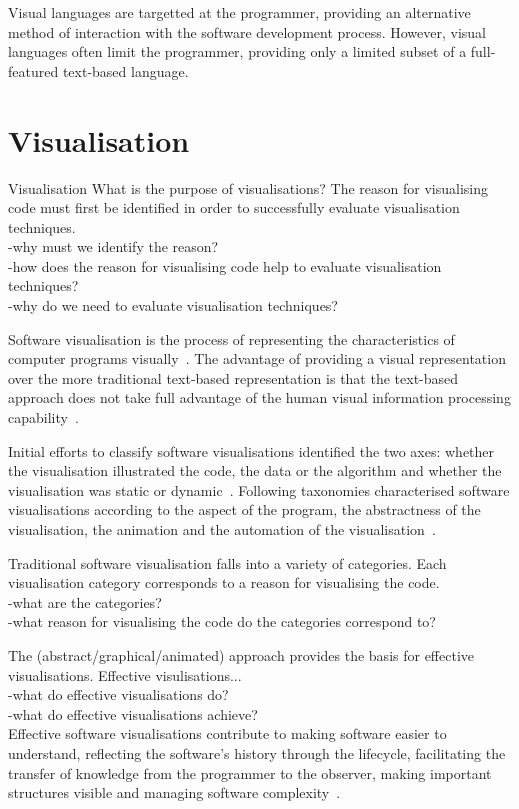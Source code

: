Visual languages are targetted at the programmer, providing an alternative method of interaction with the software development process. However, visual languages often limit the programmer, providing only a limited subset of a full-featured text-based language.

\section{Visualisation}

Visualisation 
What is the purpose of visualisations?
The reason for visualising code must first be identified in order to successfully evaluate visualisation techniques.\\
-why must we identify the reason?\\
-how does the reason for visualising code help to evaluate visualisation techniques?\\
-why do we need to evaluate visualisation techniques?

Software visualisation is the process of representing the characteristics of computer programs visually~\cite{Stasko1992}. The advantage of providing a visual representation over the more traditional text-based representation is that the text-based approach does not take full advantage of the human visual information processing capability~\cite{Myers1989}.

Initial efforts to classify software visualisations identified the two axes: whether the visualisation illustrated the code, the data or the algorithm and whether the visualisation was static or dynamic~\cite{Myers1989}. Following taxonomies characterised software visualisations according to the aspect of the program, the abstractness of the visualisation, the animation and the automation of the visualisation~\cite{Stasko1992}.


Traditional software visualisation falls into a variety of categories. Each visualisation category corresponds to a reason for visualising the code.\\
-what are the categories?\\
-what reason for visualising the code do the categories correspond to?

The (abstract/graphical/animated) approach provides the basis for effective visualisations. Effective visulisations...\\
-what do effective visualisations do?\\
-what do effective visualisations achieve?\\
Effective software visualisations contribute to making software easier to understand, reflecting the software's history through the lifecycle, facilitating the transfer of knowledge from the programmer to the observer, making important structures visible and managing software complexity~\cite{Baecker1995}.

